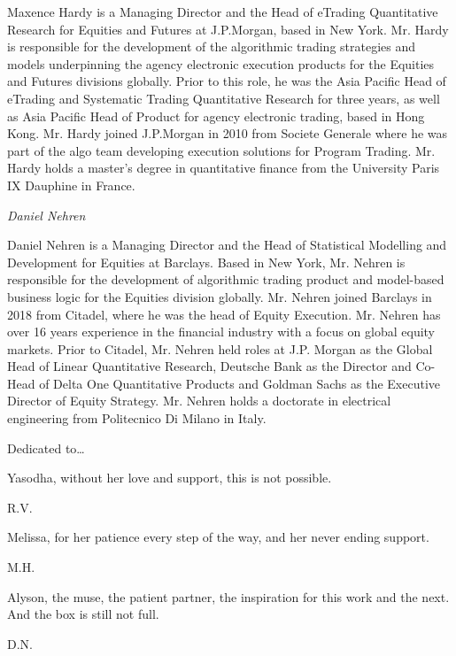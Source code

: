 \noindent Maxence Hardy is a Managing Director and the Head of eTrading Quantitative Research for Equities and Futures at J.P.Morgan, based in New York. Mr. Hardy is responsible for the development of the algorithmic trading strategies and models underpinning the agency electronic execution products for the Equities and Futures divisions globally. Prior to this role, he was the Asia Pacific Head of eTrading and Systematic Trading Quantitative Research for three years, as well as Asia Pacific Head of Product for agency electronic trading, based in Hong Kong. Mr. Hardy joined J.P.Morgan in 2010 from Societe Generale where he was part of the algo team developing execution solutions for Program Trading. Mr. Hardy holds a master's degree in quantitative finance from the University Paris IX Dauphine in France. \bigbreak

{\noindent\large\itshape Daniel Nehren} \medbreak

\noindent Daniel Nehren is a Managing Director and the Head of Statistical Modelling and Development for Equities at Barclays. Based in New York, Mr. Nehren is responsible for the development of algorithmic trading product and model-based business logic for the Equities division globally. Mr. Nehren joined Barclays in 2018 from Citadel, where he was the head of Equity Execution. Mr. Nehren has over 16 years experience in the financial industry with a focus on global equity markets. Prior to Citadel, Mr. Nehren held roles at J.P. Morgan as the Global Head of Linear Quantitative Research, Deutsche Bank as the Director and Co-Head of Delta One Quantitative Products and Goldman Sachs as the Executive Director of Equity Strategy. Mr. Nehren holds a doctorate in electrical engineering from Politecnico Di Milano in Italy.



\newpage



Dedicated to\dots \twomedskip


\begin{minipage}[t]{0.8\textwidth}
	\raggedright
		Yasodha, without her love and support, this is not possible. \par
  	\raggedleft
  	R.V.
\end{minipage} \vspace{1cm}


\begin{minipage}[t]{0.8\textwidth}
	\raggedright
		Melissa, for her patience every step of the way, and her never ending support. \par
  	\raggedleft
  	M.H.
\end{minipage} \vspace{1cm}


\begin{minipage}[t]{0.8\textwidth}
	\raggedright
		Alyson, the muse, the patient partner, the inspiration for this work and the next. And the box is still not full. \par
  	\raggedleft
  	D.N.
\end{minipage} 